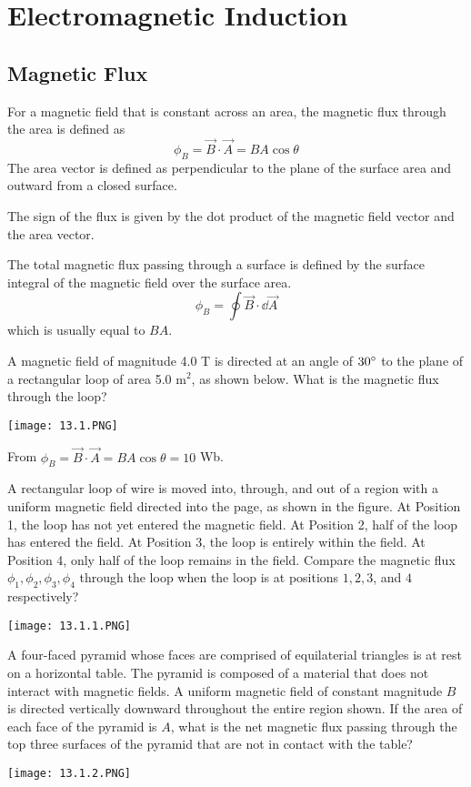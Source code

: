 \documentclass[../em.tex]{subfiles}
\begin{document}
\chapter{Electromagnetic Induction}
\section{Magnetic Flux}
For a magnetic field that is constant across an area, the magnetic flux through the area is defined as 
\[ \phi_B = \vec{B}\cdot\vec{A}=BA\cos\theta \]
The area vector is defined as perpendicular to the plane of the surface area and outward from a closed surface.

The sign of the flux is given by the dot product of the magnetic field vector and the area vector.

The total magnetic flux passing through a surface is defined by the surface integral of the magnetic field over the surface area.
\[\phi_B = \oint \vec{B}\cdot\dd\vec{A} \]
which is usually equal to $BA$.

\begin{example}
    A magnetic field of magnitude 4.0 T is directed at an angle of $30\degree$ to the plane of a rectangular loop of area 5.0 m$^2$, as shown below. What is the magnetic flux through the loop?
    \begin{center}
        \texttt{[image: 13.1.PNG]}
    \end{center}

    From $\phi_B = \vec{B}\cdot \vec{A}=BA\cos\theta = 10$ Wb.
\end{example}

\ex A rectangular loop of wire is moved into, through, and out of a region with a uniform magnetic field directed into the page, as shown in the figure. At Position 1, the loop has not yet entered the magnetic field. 
At Position 2, half of the loop has entered the field. At Position 3, the loop is entirely within the field. At Position 4, only half of the loop remains in the field. Compare the magnetic flux $\phi_1, \phi_2, \phi_3, \phi_4$ through the 
loop when the loop is at positions $1,2,3$, and $4$ respectively?
\begin{center}
    \texttt{[image: 13.1.1.PNG]}
\end{center}

\ex A four-faced pyramid whose faces are comprised of equilaterial triangles is at rest on a horizontal table. The pyramid is composed of a material that does not interact with magnetic fields. A uniform magnetic field of constant magnitude $B$ 
is directed vertically downward throughout the entire region shown. If the area of each face of the pyramid is $A$, what is the net magnetic flux passing through the top three surfaces of the pyramid that are not in contact with the table?
\begin{center}
    \texttt{[image: 13.1.2.PNG]}
\end{center}
\end{document}
